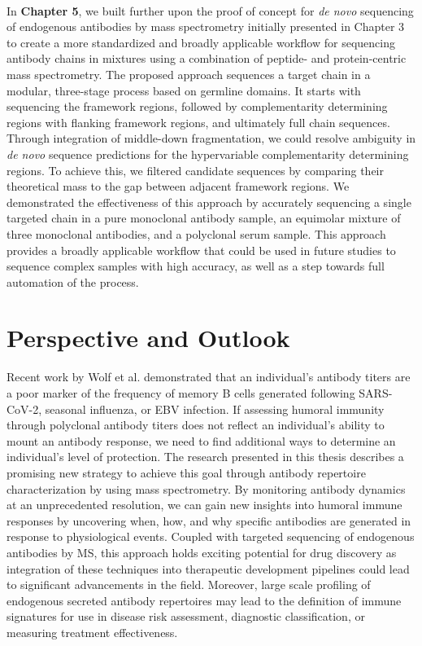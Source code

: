 \bigskip\\
In \textbf{Chapter 5}, we built further upon the proof of concept for \emph{de novo} sequencing of endogenous antibodies by mass spectrometry initially presented in Chapter 3 to create a more standardized and broadly applicable workflow for sequencing antibody chains in mixtures using a combination of peptide- and protein-centric mass spectrometry. The proposed approach sequences a target chain in a modular, three-stage process based on germline domains. It starts with sequencing the framework regions, followed by complementarity determining regions with flanking framework regions, and ultimately full chain sequences. Through integration of middle-down fragmentation, we could resolve ambiguity in \emph{de novo} sequence predictions for the hypervariable complementarity determining regions. To achieve this, we filtered candidate sequences by comparing their theoretical mass to the gap between adjacent framework regions. We demonstrated the effectiveness of this approach by accurately sequencing a single targeted chain in a pure monoclonal antibody sample, an equimolar mixture of three monoclonal antibodies, and a polyclonal serum sample. This approach provides a broadly applicable workflow that could be used in future studies to sequence complex samples with high accuracy, as well as a step towards full automation of the process.\\
\clearpage

\section{Perspective and Outlook}
Recent work by Wolf et al. \cite{wolf2022antibody} demonstrated that an individual's antibody titers are a poor marker of the frequency of memory B cells generated following SARS-CoV-2, seasonal influenza, or EBV infection. If assessing humoral immunity through polyclonal antibody titers does not reflect an individual's ability to mount an antibody response, we need to find additional ways to determine an individual's level of protection. The research presented in this thesis describes a promising new strategy to achieve this goal through antibody repertoire characterization by using mass spectrometry.
By monitoring antibody dynamics at an unprecedented resolution, we can gain new insights into humoral immune responses by uncovering when, how, and why specific antibodies are generated in response to physiological events. Coupled with targeted sequencing of endogenous antibodies by MS, this approach holds exciting potential for drug discovery as integration of these techniques into therapeutic development pipelines could lead to significant advancements in the field. Moreover, large scale profiling of endogenous secreted antibody repertoires may lead to the definition of immune signatures for use in disease risk assessment, diagnostic classification, or measuring treatment effectiveness.

